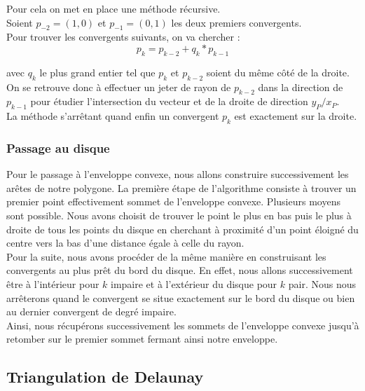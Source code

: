 Pour cela on met en place une méthode récursive.\\
Soient $p_{-2} = (1,0)$ et $p_{-1} = (0,1)$ les deux premiers convergents.\\

Pour trouver les convergents suivants, on va chercher :
$$p_{k} = p_{k-2} + q_k * p_{k-1}$$

avec $q_k$ le plus grand entier tel que $p_{k}$ et $p_{k-2}$ soient du même côté de la droite.\\

On se retrouve donc à effectuer un jeter de rayon de $p_{k-2}$ dans la direction de $p_{k-1}$ pour étudier l’intersection du vecteur et de la droite de direction $y_P / x_P$.\\

La méthode s’arrêtant quand enfin un convergent $p_{k}$ est exactement sur la droite.

\subsubsection{Passage au disque}

Pour le passage à l'enveloppe convexe, nous allons construire successivement les arêtes de notre polygone. La première étape de l'algorithme consiste à trouver un premier point effectivement sommet de l'enveloppe convexe. Plusieurs moyens sont possible. Nous avons choisit de trouver le point le plus en bas puis le plus à droite de tous les points du disque en cherchant à proximité d'un point éloigné du centre vers la bas d'une distance égale à celle du rayon.\\

Pour la suite, nous avons procéder de la même manière en construisant les convergents au plus prêt du bord du disque. En effet, nous allons successivement être à l'intérieur pour $k$ impaire et à l'extérieur du disque pour $k$ pair. Nous nous arrêterons quand le convergent se situe exactement sur le bord du disque ou bien au dernier convergent de degré impaire.\\

Ainsi, nous récupérons successivement les sommets de l'enveloppe convexe jusqu'à retomber sur le premier sommet fermant ainsi notre enveloppe.

\subsection{Triangulation de Delaunay}


